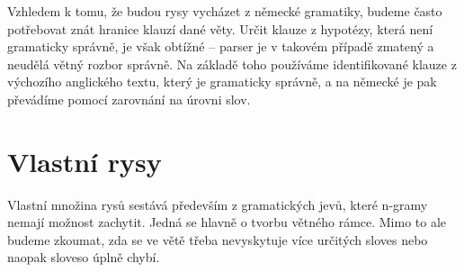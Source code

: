 \documentclass[12pt,a4paper]{report}
\begin{document}
Vzhledem k tomu, že budou rysy vycházet z německé gramatiky, budeme často potřebovat znát hranice klauzí dané věty. Určit klauze z hypotézy, která není gramaticky správně, je však obtížné -- parser je v takovém případě zmatený a neudělá větný rozbor správně. Na základě toho používáme identifikované klauze z výchozího anglického textu, který je gramaticky správně, a na německé je pak převádíme pomocí zarovnání na úrovni slov. 

\section{Vlastní rysy}
Vlastní množina rysů sestává především z gramatických jevů, které n-gramy nemají možnost zachytit. Jedná se hlavně o tvorbu větného rámce. Mimo to ale budeme zkoumat, zda se ve větě třeba nevyskytuje více určitých sloves nebo naopak sloveso úplně chybí.
\end{document}
